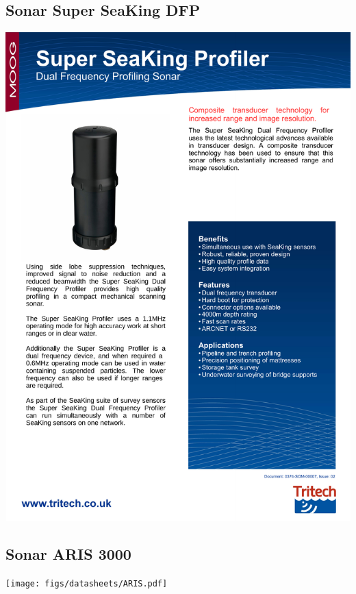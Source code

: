 \subsection{Sonar Super SeaKing DFP}
\includegraphics[width=0.9\columnwidth, page=2]{figs/datasheets/sonar.pdf}
\subsection{Sonar ARIS 3000}
\texttt{[image: figs/datasheets/ARIS.pdf]}
